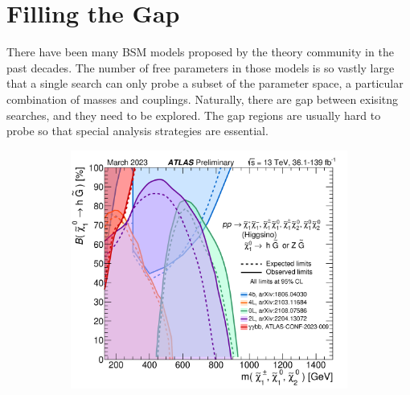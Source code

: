 \documentclass{moriond}
\begin{document}
\section{Filling the Gap}

There have been many BSM models proposed by the theory community in the past
decades. The number of free parameters in those models is so vastly large that
a single search can only probe a subset of the parameter space, a particular
combination of masses and couplings. Naturally, there are gap between exisitng
searches, and they need to be explored. The gap regions are usually hard to
probe so that special analysis strategies are essential.  


\begin{figure}[htbp!]
     \centering
     \begin{subfigure}[b]{0.32\textwidth}
         \centering
         \includegraphics[width=\textwidth]{bbyy}
         \caption{}
         \label{fig:vlq}
     \end{subfigure}
     \begin{subfigure}[b]{0.32\textwidth}
         \centering

\end{subfigure}
\end{figure}
\end{document}
